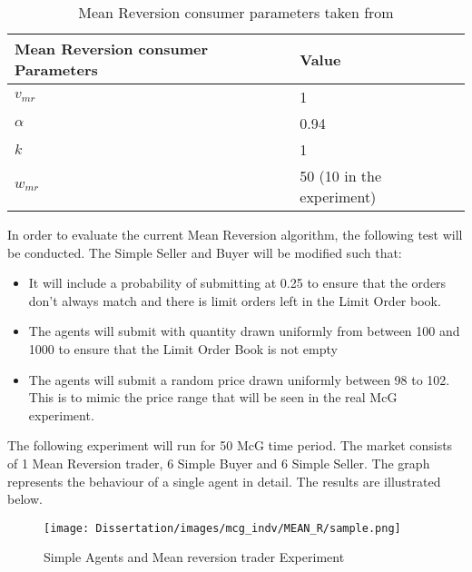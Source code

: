\begin{table}[h]
\centering
\begin{tabular}{ |m||p{4cm}|} 
\hline
\textbf{Mean Reversion consumer Parameters}& \textbf{Value} \\
\hline
\hline
$v_{mr}$ & 1 \\ 
\hline
$\alpha$ & 0.94\\ 
\hline
$k$ & 1 \\ 
\hline
$w_{mr}$ & 50 (10 in the experiment)\\ 
\hline
\end{tabular}
\caption{Mean Reversion consumer parameters taken from \cite{McGroarty}}  
\end{table}
\FloatBarrier

In order to evaluate the current Mean Reversion algorithm, the following test will be conducted. The Simple Seller and Buyer will be modified such that:
\begin{itemize}
  \item It will include a probability of submitting at 0.25 to ensure that the orders don't always match and there is limit orders left in the Limit Order book. 
  \item The agents will submit with quantity drawn uniformly from between 100 and 1000 to ensure that the Limit Order Book is not empty
  \item The agents will submit a random price drawn uniformly between 98 to 102. This is to mimic the price range that will be seen in the real McG experiment. 
\end{itemize}

The following experiment will run for 50 McG time period. The market consists of 1 Mean Reversion trader, 6 Simple Buyer and 6 Simple Seller. The graph represents the behaviour of a single agent in detail. The results are illustrated below. 

\begin{figure}[h]
\texttt{[image: Dissertation/images/mcg\_indv/MEAN\_R/sample.png]}
\caption{Simple Agents and Mean reversion trader Experiment} 
\label{fig:MR_first_test}
\end{figure} 
\FloatBarrier

